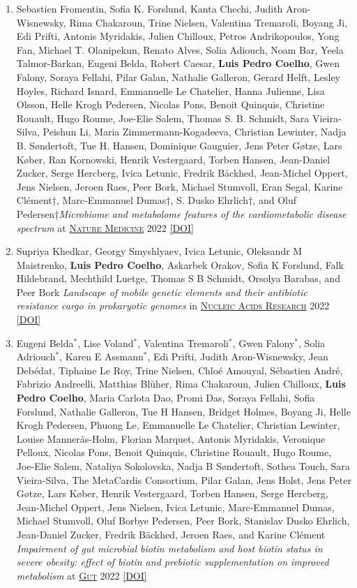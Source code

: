 \documentclass{article}
\newcommand\showdoi[1]{%
    \href{http://dx.doi.org/#1}{[DOI]}%
}
\newcommand\pubname[1]{\textsc{\uline{#1}}}
\newcommand\costar{${}^{*}$}
\newcommand\cosenior{†}
\begin{document}
\begin{enumerate}[resume]
\item Sebastien Fromentin, Sofia K. Forslund, Kanta Chechi, Judith Aron-Wisnewsky, Rima Chakaroun, Trine Nielsen, Valentina Tremaroli, Boyang Ji, Edi Prifti, Antonis Myridakis, Julien Chilloux, Petros Andrikopoulos, Yong Fan, Michael T. Olanipekun, Renato Alves, Solia Adiouch, Noam Bar, Yeela Talmor-Barkan, Eugeni Belda, Robert Caesar, \textbf{Luis Pedro Coelho}, Gwen Falony, Soraya Fellahi, Pilar Galan, Nathalie Galleron, Gerard Helft, Lesley Hoyles, Richard Isnard, Emmanuelle Le Chatelier, Hanna Julienne, Lisa Olsson, Helle Krogh Pedersen, Nicolas Pons, Benoit Quinquis, Christine Rouault, Hugo Roume, Joe-Elie Salem, Thomas S. B. Schmidt, Sara Vieira-Silva, Peishun Li, Maria Zimmermann-Kogadeeva, Christian Lewinter, Nadja B. Søndertoft, Tue H. Hansen, Dominique Gauguier, Jens Peter Gøtze, Lars Køber, Ran Kornowski, Henrik Vestergaard, Torben Hansen, Jean-Daniel Zucker, Serge Hercberg, Ivica Letunic, Fredrik Bäckhed, Jean-Michel Oppert, Jens Nielsen, Jeroen Raes, Peer Bork, Michael Stumvoll, Eran Segal, Karine Clément\cosenior, Marc-Emmanuel Dumas\cosenior, S. Dusko Ehrlich\cosenior, and Oluf Pedersen\cosenior \emph{Microbiome and metabolome features of the cardiometabolic disease spectrum} at \pubname{Nature Medicine} 2022 \showdoi{10.1038/s41591-022-01688-4}

\item Supriya Khedkar, Georgy Smyshlyaev, Ivica Letunic, Oleksandr M Maistrenko, \textbf{Luis Pedro Coelho}, Askarbek Orakov, Sofia K Forslund, Falk Hildebrand, Mechthild Luetge, Thomas S B Schmidt, Orsolya Barabas, and Peer Bork \emph{Landscape of mobile genetic elements and their antibiotic resistance cargo in prokaryotic genomes} in \pubname{Nucleic Acids Research} 2022 \showdoi{10.1093/nar/gkac163}

\item Eugeni Belda\costar, Lise Voland\costar, Valentina Tremaroli\costar, Gwen Falony\costar, Solia Adriouch\costar, Karen E Assmann\costar, Edi Prifti, Judith Aron-Wisnewsky, Jean Debédat, Tiphaine Le Roy, Trine Nielsen, Chloé Amouyal, Sébastien André, Fabrizio Andreelli, Matthias Blüher, Rima Chakaroun, Julien Chilloux, \textbf{Luis Pedro Coelho}, Maria Carlota Dao, Promi Das, Soraya Fellahi, Sofia Forslund, Nathalie Galleron, Tue H Hansen, Bridget Holmes, Boyang Ji, Helle Krogh Pedersen, Phuong Le, Emmanuelle Le Chatelier, Christian Lewinter, Louise Mannerås-Holm, Florian Marquet, Antonis Myridakis, Veronique Pelloux, Nicolas Pons, Benoit Quinquis, Christine Rouault, Hugo Roume, Joe-Elie Salem, Nataliya Sokolovska, Nadja B Søndertoft, Sothea Touch, Sara Vieira-Silva, The MetaCardis Consortium, Pilar Galan, Jens Holst, Jens Peter Gøtze, Lars Køber, Henrik Vestergaard, Torben Hansen, Serge Hercberg, Jean-Michel Oppert, Jens Nielsen, Ivica Letunic, Marc-Emmanuel Dumas, Michael Stumvoll, Oluf Borbye Pedersen, Peer Bork, Stanislav Dusko Ehrlich, Jean-Daniel Zucker, Fredrik Bäckhed, Jeroen Raes, and Karine Clément \emph{Impairment of gut microbial biotin metabolism and host biotin status in severe obesity: effect of biotin and prebiotic supplementation on improved metabolism} at \pubname{Gut} 2022 \showdoi{10.1136/gutjnl-2021-325753}


\end{enumerate}
\end{document}
